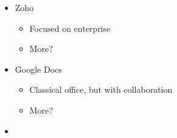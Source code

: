 \begin{itemize}
  \begin{itemize}
    \item Zoho
    \begin{itemize}
      \item Focused on enterprise
      \item More?
    \end{itemize}
    \item Google Docs
    \begin{itemize}
      \item Classical office, but with collaboration
      \item More?
    \end{itemize}
  \item {} 
\end{itemize}
\end{itemize}
